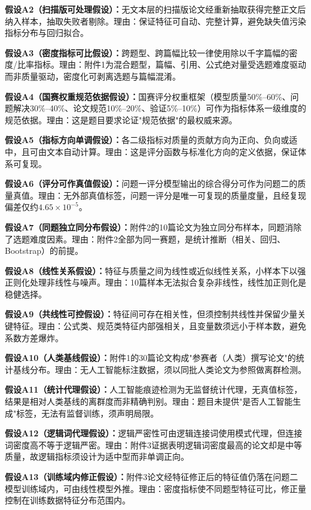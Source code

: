 \documentclass[withoutpreface]{cumcmthesis}
\begin{document}
\textbf{假设A2（扫描版可处理假设）：}无文本层的扫描版论文经重新抽取获得完整正文后纳入样本，抽取失败者剔除。理由：保证特征可自动、完整计算，避免缺失值污染指标分布与回归拟合。

\textbf{假设A3（密度指标可比假设）：}跨题型、跨篇幅比较一律使用除以千字篇幅的密度/比率指标。理由：附件1为混合题型，篇幅、引用、公式绝对量受选题难度驱动而非质量驱动，密度化可剥离选题与篇幅混淆。

\textbf{假设A4（国赛权重规范依据假设）：}国赛评分权重框架（模型质量50\%–60\%、问题解决30\%–40\%、论文规范10\%–20\%、验证5\%–10\%）可作为指标体系一级维度的规范依据。理由：这是题目要求论证"规范依据"的最权威来源。

\textbf{假设A5（指标方向单调假设）：}各二级指标对质量的贡献方向为正向、负向或适中，且可由文本自动计算。理由：这是评分函数与标准化方向的定义依据，保证体系可复现。

\textbf{假设A6（评分可作真值假设）：}问题一评分模型输出的综合得分可作为问题二的质量真值。理由：无外部真值标签，问题一评分是唯一可复现的质量度量，且经复现偏差仅约$4.65\times10^{-5}$。

\textbf{假设A7（同题独立同分布假设）：}附件2的10篇论文为独立同分布样本，同题消除了选题难度因素。理由：附件2全部为同一赛题，是统计推断（相关、回归、Bootstrap）的前提。

\textbf{假设A8（线性关系假设）：}特征与质量之间为线性或近似线性关系，小样本下以强正则化处理非线性与噪声。理由：10篇样本无法拟合复杂非线性，线性加正则化是稳健选择。

\textbf{假设A9（共线性可控假设）：}特征间可存在相关性，但须控制共线性并保留少量关键特征。理由：公式类、规范类特征内部强相关，且变量数须远小于样本数，避免系数方差爆炸。

\textbf{假设A10（人类基线假设）：}附件1的30篇论文构成"参赛者（人类）撰写论文"的统计基线分布。理由：无人工智能标注数据，须以同批人类论文为参照做离群检测。

\textbf{假设A11（统计代理假设）：}人工智能痕迹检测为无监督统计代理，无真值标签，结果是相对人类基线的离群度而非精确判别。理由：题目未提供"是否人工智能生成"标签，无法有监督训练，须声明局限。

\textbf{假设A12（逻辑词代理假设）：}逻辑严密性可由逻辑连接词使用模式代理，但连接词密度高不等于逻辑严密。理由：附件3证据表明逻辑词密度最高的论文却是中等质量，故逻辑指标须设计为适中型而非单调正向。

\textbf{假设A13（训练域内修正假设）：}附件3论文经特征修正后的特征值仍落在问题二模型训练域内，可由线性模型外推。理由：密度指标使不同题型特征可比，修正量控制在训练数据特征分布范围内。
\end{document}
